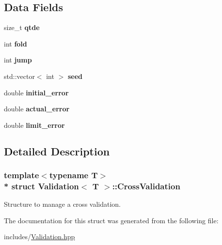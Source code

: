 \subsection*{Data Fields}
\begin{DoxyCompactItemize}
\item 
size\+\_\+t {\bfseries qtde}\hypertarget{struct_validation_1_1_cross_validation_a1390b0775383e95347b9d502376b028a}{}\label{struct_validation_1_1_cross_validation_a1390b0775383e95347b9d502376b028a}

\item 
int {\bfseries fold}\hypertarget{struct_validation_1_1_cross_validation_a24522e62bed86b222427793059358453}{}\label{struct_validation_1_1_cross_validation_a24522e62bed86b222427793059358453}

\item 
int {\bfseries jump}\hypertarget{struct_validation_1_1_cross_validation_aaa216ea500fc18c08d5b2b6ecfa2d6b5}{}\label{struct_validation_1_1_cross_validation_aaa216ea500fc18c08d5b2b6ecfa2d6b5}

\item 
std\+::vector$<$ int $>$ {\bfseries seed}\hypertarget{struct_validation_1_1_cross_validation_a759a6c1c6ebce11575401fb0cc397e06}{}\label{struct_validation_1_1_cross_validation_a759a6c1c6ebce11575401fb0cc397e06}

\item 
double {\bfseries initial\+\_\+error}\hypertarget{struct_validation_1_1_cross_validation_acdccfcf784001cd120096263fe27e03d}{}\label{struct_validation_1_1_cross_validation_acdccfcf784001cd120096263fe27e03d}

\item 
double {\bfseries actual\+\_\+error}\hypertarget{struct_validation_1_1_cross_validation_a58b86e73f6085890ec4cf4b755bb5ab0}{}\label{struct_validation_1_1_cross_validation_a58b86e73f6085890ec4cf4b755bb5ab0}

\item 
double {\bfseries limit\+\_\+error}\hypertarget{struct_validation_1_1_cross_validation_af6298877a122a8e4bcd447277476677b}{}\label{struct_validation_1_1_cross_validation_af6298877a122a8e4bcd447277476677b}

\end{DoxyCompactItemize}


\subsection{Detailed Description}
\subsubsection*{template$<$typename T$>$\\*
struct Validation$<$ T $>$\+::\+Cross\+Validation}

Structure to manage a cross validation. 

The documentation for this struct was generated from the following file\+:\begin{DoxyCompactItemize}
\item 
includes/\hyperlink{_validation_8hpp}{Validation.\+hpp}\end{DoxyCompactItemize}
